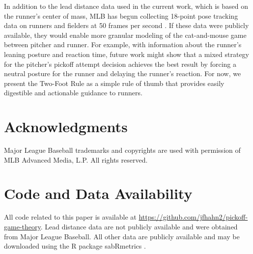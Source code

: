 \documentclass{article}
\begin{document}
    In addition to the lead distance data used in the current work, which is based on the runner's center of mass, MLB has begun collecting 18-point pose tracking data on runners and fielders at 50 frames per second \parencite{jedlovec_introducing_2020}. If these data were publicly available, they would enable more granular modeling of the cat-and-mouse game between pitcher and runner. For example, with information about the runner's leaning posture and reaction time, future work might show that a mixed strategy for the pitcher's pickoff attempt decision achieves the best result by forcing a neutral posture for the runner and delaying the runner's reaction. For now, we present the Two-Foot Rule as a simple rule of thumb that provides easily digestible and actionable guidance to runners.

  \section*{Acknowledgments}

    Major League Baseball trademarks and copyrights are used with permission of MLB Advanced Media, L.P. All rights reserved.

  \section*{Code and Data Availability}

    All code related to this paper is available at \url{https://github.com/jfhahn2/pickoff-game-theory}. Lead distance data are not publicly available and were obtained from Major League Baseball. All other data are publicly available and may be downloaded using the R package sabRmetrics \parencite{powers_sabrmetrics_2025}.

  \printbibliography
\end{document}
